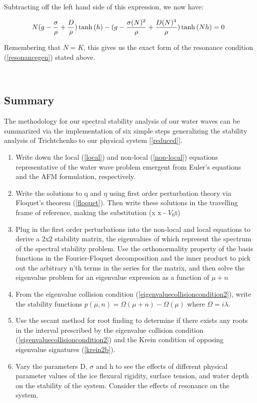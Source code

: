 \documentclass{article}
\begin{document}
Subtracting off the left hand side of this expression, we now have: 

\begin{equation} 
  N(g - \frac{\sigma }{\rho} + \frac{D }{\rho})\tanh{(h)}  - (g - \frac{\sigma(N)^2}{\rho} + \frac{D(N)^4}{\rho})\tanh{(Nh)} = 0   \\
\end{equation} 

Remembering that \(N = K\), this gives us the exact form of the resonance condition (\ref{resonancegen}) stated above.




\\

\subsection{Summary}

The methodology for our spectral stability analysis of our water waves can be summarized via the implementation of six simple steps generalizing the stability analysis of Trichtchenko to our physical system [\ref{reduced}].

\begin{enumerate}
  \item Write down the local (\ref{local}) and non-local (\ref{non-local}) equations representative of the water wave problem emergent from Euler's equations and the AFM formulation, respectively.
  \item Write the solutions to q and \(\eta\) using first order perturbation theory via Floquet's theorem (\ref{floquet}). Then write these solutions in the travelling frame of reference, making the substitution (x \implies x - \(V_{0}\)t)
  \item Plug in the first order perturbations into the non-local and local equations to derive a 2x2 stability matrix, the eigenvalues of which represent the spectrum of the spectral stability problem. Use the orthonormality property of the basis functions in the Fourier-Floquet decomposition and the inner product to pick out the arbitrary n'th terms in the series for the matrix, and then solve the eigenvalue problem for an eigenvalue expression as a function of \(\mu + n\)
  \item From the eigenvalue collision condition (\ref{eigenvaluecollisioncondition2}), write the stability functions \(p(\mu,n) = \Omega(\mu + n) - \Omega(\mu)\) where \( \Omega =  i\lambda\). 
  \item Use the secant method for root finding to determine if there exists any roots in the interval prescribed by the eigenvalue collision condition (\ref{eigenvaluecollisioncondition2}) and the Krein condition of opposing eigenvalue signatures (\ref{krein2b}). 
  \item Vary the parameters D, \(\sigma\) and h to see the effects of different physical parameter values of the ice flexural rigidity, surface tension, and water depth on the stability of the system. Consider the effects of resonance on the system.
\end{enumerate}
\\
\end{document}
